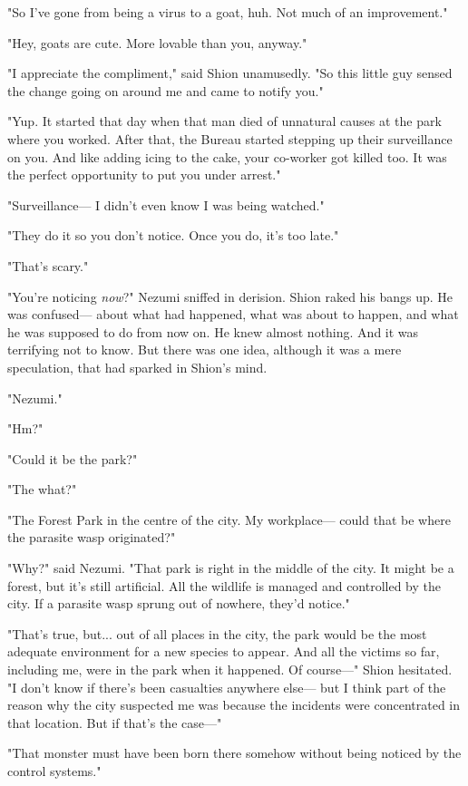 "So I've gone from being a virus to a goat, huh. Not much of an
improvement."

"Hey, goats are cute. More lovable than you, anyway."

"I appreciate the compliment," said Shion unamusedly. "So this little
guy sensed the change going on around me and came to notify you."

"Yup. It started that day when that man died of unnatural causes at the
park where you worked. After that, the Bureau started stepping up their
surveillance on you. And like adding icing to the cake, your co-worker
got killed too. It was the perfect opportunity to put you under arrest."

"Surveillance--- I didn't even know I was being watched."

"They do it so you don't notice. Once you do, it's too late."

"That's scary."

"You're noticing \emph{now}?" Nezumi sniffed in derision. Shion raked his bangs
up. He was confused--- about what had happened, what was about to happen,
and what he was supposed to do from now on. He knew almost nothing. And
it was terrifying not to know. But there was one idea, although it was a
mere speculation, that had sparked in Shion's mind.

\mybreak

"Nezumi."

"Hm?"

"Could it be the park?"

"The what?"

"The Forest Park in the centre of the city. My workplace--- could that be
where the parasite wasp originated?"

"Why?" said Nezumi. "That park is right in the middle of the city. It
might be a forest, but it's still artificial. All the wildlife is
managed and controlled by the city. If a parasite wasp sprung out of
nowhere, they'd notice."

"That's true, but... out of all places in the city, the park would be
the most adequate environment for a new species to appear. And all the
victims so far, including me, were in the park when it happened. Of
course---" Shion hesitated. "I don't know if there's been casualties
anywhere else--- but I think part of the reason why the city suspected me
was because the incidents were concentrated in that location. But if
that's the case---"

"That monster must have been born there somehow without being noticed by
the control systems."

